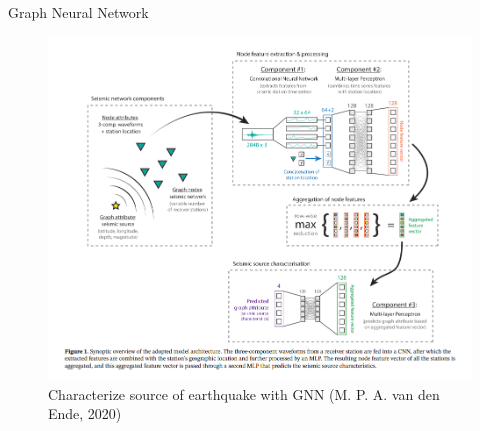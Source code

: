 \documentclass{beamer}
\begin{document}
	
	\begin{frame}[t]{Graph Neural Network}
		\begin{figure}
			\includegraphics[scale=0.3]{gnn.png}
			\caption{Characterize source of earthquake with GNN (M. P. A. van den Ende, 2020)}
		\end{figure}
	\end{frame}
	
\end{document}
